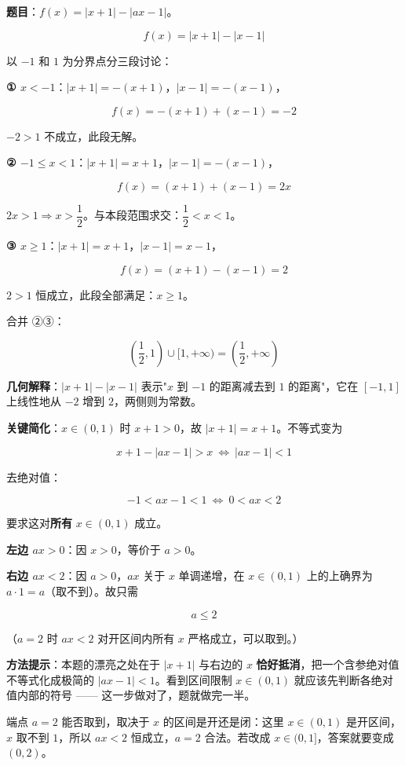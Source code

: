 
\textbf{题目}：$f(x)=|x+1|-|ax-1|$。


\[f(x)=|x+1|-|x-1|\]

以 $-1$ 和 $1$ 为分界点分三段讨论：

\textbf{① $x<-1$}：$|x+1|=-(x+1)$，$|x-1|=-(x-1)$，

\[f(x)=-(x+1)+(x-1)=-2\]

$-2>1$ 不成立，此段无解。

\textbf{② $-1\le x<1$}：$|x+1|=x+1$，$|x-1|=-(x-1)$，

\[f(x)=(x+1)+(x-1)=2x\]

$2x>1\Rightarrow x>\dfrac12$。与本段范围求交：$\dfrac12<x<1$。

\textbf{③ $x\ge1$}：$|x+1|=x+1$，$|x-1|=x-1$，

\[f(x)=(x+1)-(x-1)=2\]

$2>1$ 恒成立，此段全部满足：$x\ge1$。

合并 ②③：

\[\left(\frac12,1\right)\cup[1,+\infty)=\left(\frac12,+\infty\right)\]


\begin{gktip}
\textbf{几何解释}：$|x+1|-|x-1|$ 表示"$x$ 到 $-1$ 的距离减去到 $1$ 的距离"，它在 $[-1,1]$ 上线性地从 $-2$ 增到 $2$，两侧则为常数。
\end{gktip}


\textbf{关键简化}：$x\in(0,1)$ 时 $x+1>0$，故 $|x+1|=x+1$。不等式变为

\[x+1-|ax-1|>x\ \Longleftrightarrow\ |ax-1|<1\]

去绝对值：

\[-1<ax-1<1\ \Longleftrightarrow\ 0<ax<2\]

要求这对\textbf{所有} $x\in(0,1)$ 成立。

\textbf{左边 $ax>0$}：因 $x>0$，等价于 $a>0$。

\textbf{右边 $ax<2$}：因 $a>0$，$ax$ 关于 $x$ 单调递增，在 $x\in(0,1)$ 上的上确界为 $a\cdot1=a$（取不到）。故只需

\[a\le2\]

（$a=2$ 时 $ax<2$ 对开区间内所有 $x$ 严格成立，可以取到。）

\gkanswer{答案：$a\in(0,2]$}

\begin{gktip}
\textbf{方法提示}：本题的漂亮之处在于 $|x+1|$ 与右边的 $x$ \textbf{恰好抵消}，把一个含参绝对值不等式化成极简的 $|ax-1|<1$。看到区间限制 $x\in(0,1)$ 就应该先判断各绝对值内部的符号 —— 这一步做对了，题就做完一半。

端点 $a=2$ 能否取到，取决于 $x$ 的区间是开还是闭：这里 $x\in(0,1)$ 是开区间，$x$ 取不到 $1$，所以 $ax<2$ 恒成立，$a=2$ 合法。若改成 $x\in(0,1]$，答案就要变成 $(0,2)$。
\end{gktip}

\par\medskip

